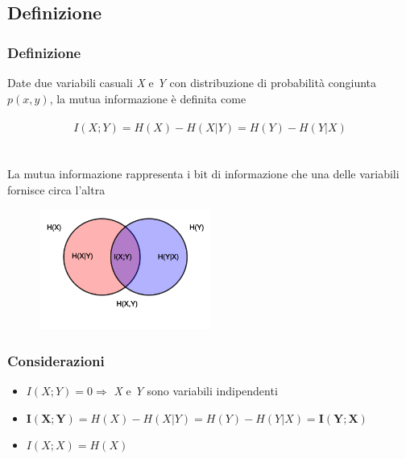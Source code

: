 \documentclass{beamer}
\begin{document}
\subsection{Definizione}
\begin{frame}
	\frametitle{Definizione}
		\nocite{Ding:2003:MRF:937976.938050}
		\nocite{Peng05featureselection}
Date due variabili casuali \emph{X} e \emph{Y} con distribuzione di probabilità congiunta $p(x, y)$, la mutua
informazione è definita come \\~$$I(X; Y ) = H(X) − H(X|Y ) = H(Y ) − H(Y |X)$$\\~\\
La mutua informazione rappresenta i bit di informazione che una delle variabili fornisce circa l'altra
\begin{figure}[htb]
	\includegraphics[width=0.50\textwidth]{figure/mutual.png}
\end{figure}
\end{frame}
\begin{frame}
	\frametitle{Considerazioni}
	\begin{itemize}
		\item $I(X;Y)=0 \Rightarrow$ \emph{X} e \emph{Y} sono variabili indipendenti
		\item $\pmb{I(X;Y)} = H(X)-H(X|Y)=H(Y)-H(Y|X)= \pmb{I(Y;X)}$
		\item $I(X;X)=H(X)$
	\end{itemize}
\end{frame}
\end{document}

